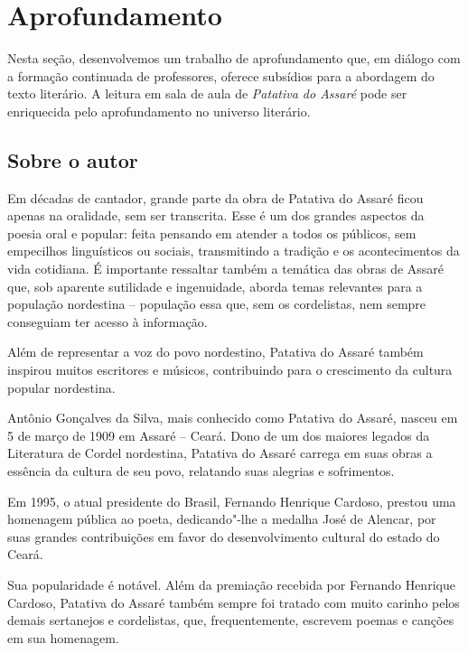 \documentclass[12pt]{extarticle}
\begin{document}

\section{Aprofundamento}

Nesta seção, desenvolvemos um trabalho de aprofundamento que, em diálogo
com a formação continuada de professores, oferece subsídios para a
abordagem do texto literário. A leitura em sala de aula de
\emph{Patativa do Assaré} pode ser enriquecida pelo aprofundamento no
universo literário.

\subsection{{Sobre o autor}}
Em décadas de cantador, grande parte da obra de Patativa do Assaré ficou
apenas na oralidade, sem ser transcrita. Esse é um dos grandes aspectos
da poesia oral e popular: feita pensando em atender a todos os públicos,
sem empecilhos linguísticos ou sociais, transmitindo a tradição e os
acontecimentos da vida cotidiana. É importante ressaltar também a
temática das obras de Assaré que, sob aparente sutilidade e ingenuidade,
aborda temas relevantes para a população nordestina -- população essa
que, sem os cordelistas, nem sempre conseguiam ter acesso à informação.

Além de representar a voz do povo nordestino, Patativa do Assaré também
inspirou muitos escritores e músicos, contribuindo para o crescimento da
cultura popular nordestina.

Antônio Gonçalves da Silva, mais conhecido como Patativa do Assaré,
nasceu em 5 de março de 1909 em Assaré -- Ceará. Dono de um dos maiores
legados da Literatura de Cordel nordestina, Patativa do Assaré carrega
em suas obras a essência da cultura de seu povo, relatando suas alegrias
e sofrimentos.


Em 1995, o atual presidente do Brasil, Fernando Henrique Cardoso,
prestou uma homenagem pública ao poeta, dedicando"-lhe a medalha José de
Alencar, por suas grandes contribuições em favor do desenvolvimento
cultural do estado do Ceará.

Sua popularidade é notável. Além da premiação recebida por Fernando
Henrique Cardoso, Patativa do Assaré também sempre foi tratado com muito
carinho pelos demais sertanejos e cordelistas, que, frequentemente,
escrevem poemas e canções em sua homenagem.
\end{document}

